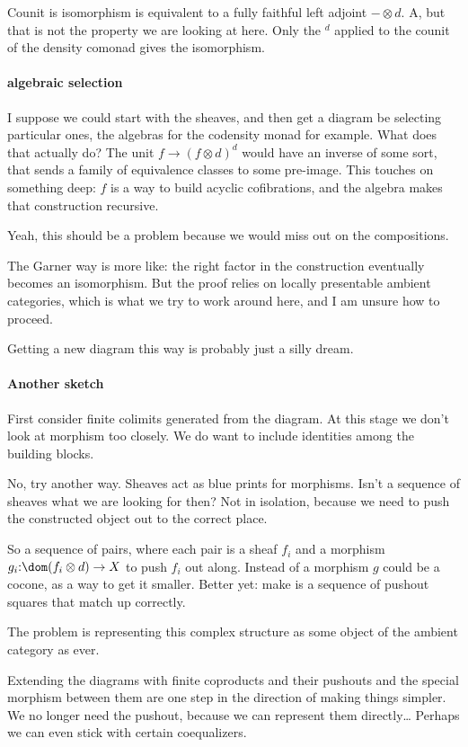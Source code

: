 \documentclass[csh.tex]{subfiles}
\begin{document}
Counit is isomorphism is equivalent to a fully faithful left adjoint $-\otimes d$. A, but that is not the property we are looking at here. Only the $^d$ applied to the counit of the density comonad gives the isomorphism.

\paragraph{algebraic selection}
I suppose we could start with the sheaves, and then get a diagram be selecting particular ones, the algebras for the codensity monad for example. What does that actually do? 
The unit $f \to (f\otimes d)^d$ would have an inverse of some sort, that
sends a family of equivalence classes to some pre-image. This touches on
something deep: $f$ is a way to build acyclic cofibrations, and
the algebra makes that construction recursive.

Yeah, this should be a problem because we would miss out on the compositions.

The Garner way is more like: the right factor in the construction eventually becomes an isomorphism. But the proof relies on locally presentable ambient categories, which is what we try to work around here, and I am unsure how to proceed.

Getting a new diagram this way is probably just a silly dream.

\paragraph{Another sketch}
First consider finite colimits generated from the diagram. At this stage we don't look at morphism too closely. We do want to include identities among the building blocks.

No, try another way. Sheaves act as blue prints for morphisms. Isn't a sequence of sheaves what we are looking for then?
Not in isolation, because we need to push the constructed object out to the correct place.

So a sequence of pairs, where each pair is a sheaf $f_i$ and a morphism $g_i\of \dom(f_i\otimes d)\to X$ to push $f_i$ out along.
Instead of a morphism $g$ could be a cocone, as a way to get it smaller.
Better yet: make is a sequence of pushout squares that match up correctly.

The problem is representing this complex structure as some object of the ambient category as ever.

Extending the diagrams with finite coproducts and their pushouts and the special morphism between them are one step in the direction of making things simpler. We no longer need the pushout, because we can represent them directly\dots
Perhaps we can even stick with certain coequalizers.
\end{document}

